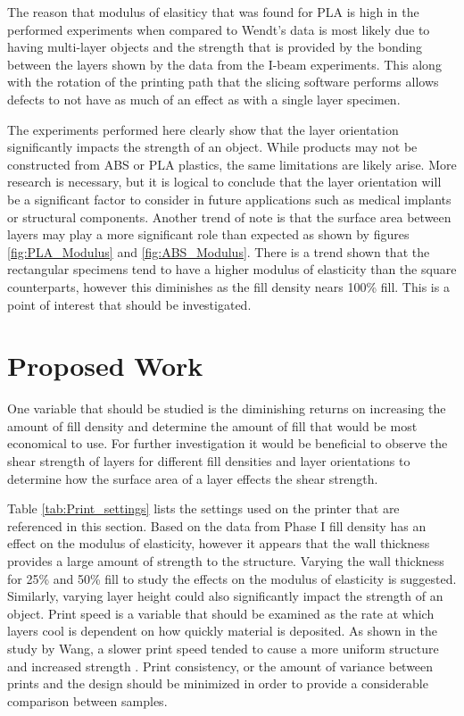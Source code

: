 	The reason that modulus of elasiticy that was found for PLA is high in the performed experiments when compared to Wendt's data is most likely due to having multi-layer objects and the strength that is provided by the bonding between the layers shown by the data from the I-beam experiments. This along with the rotation of the printing path that the slicing software performs allows defects to not have as much of an effect as with a single layer specimen. \par
	The experiments performed here clearly show that the layer orientation significantly impacts the strength of an object. While products may not be constructed from ABS or PLA plastics, the same limitations are likely arise. More research is necessary, but it is logical to conclude that the layer orientation will be a significant factor to consider in future applications such as medical implants or structural components. Another trend of note is that the surface area between layers may play a more significant role than expected as shown by figures \ref{fig:PLA_Modulus} and \ref{fig:ABS_Modulus}. There is a trend shown that the rectangular specimens tend to have a higher modulus of elasticity than the square counterparts, however this diminishes as the fill density nears 100\% fill. This is a point of interest that should be investigated.\par


\section{Proposed Work}
	One variable that should be studied is the diminishing returns on increasing the amount of fill density and determine the amount of fill that would be most economical to use. For further investigation it would be beneficial to observe the shear strength of layers for different fill densities and layer orientations to determine how the surface area of a layer effects the shear strength. \par
	Table \ref{tab:Print_settings} lists the settings used on the printer that are referenced in this section. Based on the data from Phase I fill density has an effect on the modulus of elasticity, however it appears that the wall thickness provides a large amount of strength to the structure. Varying the wall thickness for 25\% and 50\% fill to study the effects on the modulus of elasticity is suggested. Similarly, varying layer height could also significantly impact the strength of an object. Print speed is a variable that should be examined as the rate at which layers cool is dependent on how quickly material is deposited. As shown in the study by Wang, a slower print speed tended to cause a more uniform structure and increased strength \citep{Wang2016}. Print consistency, or the amount of variance between prints and the design should be minimized in order to provide a considerable comparison between samples. \par
	

